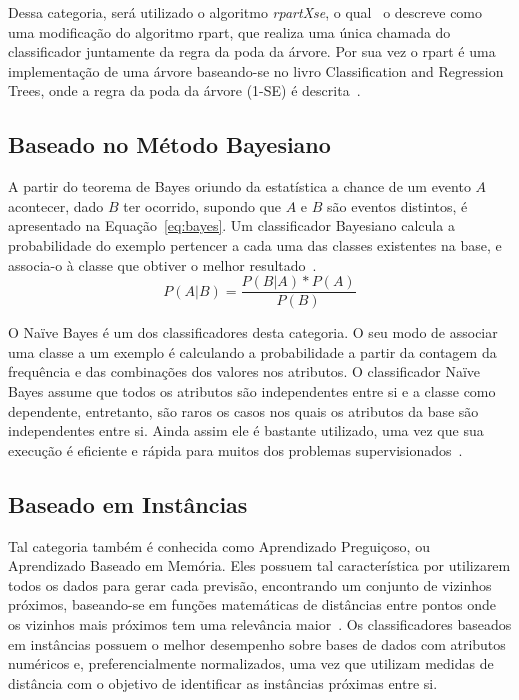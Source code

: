        Dessa categoria, será utilizado o algoritmo \textit{rpartXse}, o qual~ o descreve como uma modificação do algoritmo \ac{rpart}, que realiza uma única chamada do classificador juntamente da regra da poda da árvore. Por sua vez o \ac{rpart} é uma implementação de uma árvore baseando\hyp{se} no livro Classification and Regression Trees, onde a regra da poda da árvore (1-SE) é descrita~\cite{breiman1984tree, therneau2000tree}.


    \subsection{Baseado no Método Bayesiano}
        \label{subsec:bayesiano-method}
        A partir do teorema de Bayes oriundo da estatística a chance de um evento $A$ acontecer, dado $B$ ter ocorrido, supondo que $A$ e $B$ são eventos distintos, é apresentado na Equação~\ref{eq:bayes}. Um classificador Bayesiano calcula a probabilidade do exemplo pertencer a cada uma das classes existentes na base, e associa-o à classe que obtiver o melhor resultado~\cite{alpaydin2004introduction, au2017bayes, zellner1996bayes}.
        \begin{equation}
            \label{eq:bayes}
            P(A|B) = \frac{P(B|A) * P(A)}{P(B)}
        \end{equation}
        
        O Na\"ive Bayes é um dos classificadores desta categoria. O seu modo de associar uma classe a um exemplo é calculando a probabilidade a partir da contagem da frequência e das combinações dos valores nos atributos. O classificador Na\"ive Bayes assume que todos os atributos são independentes entre si e a classe como dependente, entretanto, são raros os casos nos quais os atributos da base são independentes entre si. Ainda assim ele é bastante utilizado, uma vez que sua execução é eficiente e rápida para muitos dos problemas supervisionados~\cite{dimitoglou2012naive}.


    \subsection{Baseado em Instâncias}
        \label{subsec:instace-methods}
        Tal categoria também é conhecida como Aprendizado Preguiçoso, ou Aprendizado Baseado em Memória. Eles possuem tal característica por utilizarem todos os dados para gerar cada previsão, encontrando um conjunto de vizinhos próximos, baseando-se em funções matemáticas de distâncias entre pontos onde os vizinhos mais próximos tem uma relevância maior~\cite{atkeson1997lazy, russell2009artificial}. Os classificadores baseados em instâncias possuem o melhor desempenho sobre bases de dados com atributos numéricos e, preferencialmente normalizados, uma vez que utilizam medidas de distância com o objetivo de identificar as instâncias próximas entre si.

